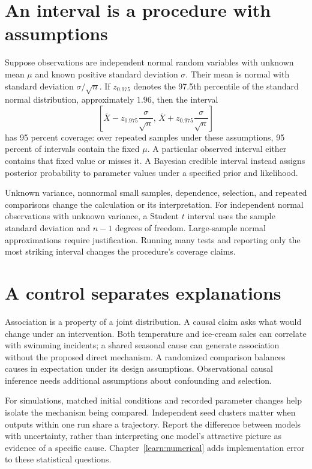 \section{An interval is a procedure with assumptions}
Suppose observations are independent normal random variables with unknown
mean $\mu$ and known positive standard deviation $\sigma$. Their mean is
normal with standard deviation $\sigma/\sqrt n$. If $z_{0.975}$ denotes
the 97.5th percentile of the standard normal distribution, approximately
$1.96$, then the interval
\[
 \left[\overline X-z_{0.975}\frac{\sigma}{\sqrt n},\,
       \overline X+z_{0.975}\frac{\sigma}{\sqrt n}\right]
\]
has 95 percent coverage: over repeated samples under these assumptions,
95 percent of intervals contain the fixed $\mu$. A particular observed
interval either contains that fixed value or misses it. A Bayesian credible
interval instead assigns posterior probability to parameter values under a
specified prior and likelihood.

Unknown variance, nonnormal small samples, dependence, selection, and repeated
comparisons change the calculation or its interpretation. For independent
normal observations with unknown variance, a Student $t$ interval uses the
sample standard deviation and $n-1$ degrees of freedom. Large-sample normal
approximations require justification. Running many tests and reporting only
the most striking interval changes the procedure's coverage claims.

\section{A control separates explanations}
Association is a property of a joint distribution. A causal claim asks what
would change under an intervention. Both temperature and ice-cream sales
can correlate with swimming incidents; a shared seasonal cause can generate
association without the proposed direct mechanism. A randomized comparison
balances causes in expectation under its design assumptions. Observational
causal inference needs additional assumptions about confounding and selection.

For simulations, matched initial conditions and recorded parameter changes
help isolate the mechanism being compared. Independent seed clusters matter
when outputs within one run share a trajectory. Report the difference between
models with uncertainty, rather than interpreting one model's attractive
picture as evidence of a specific cause. Chapter~\ref{learn:numerical}
adds implementation error to these statistical questions.

